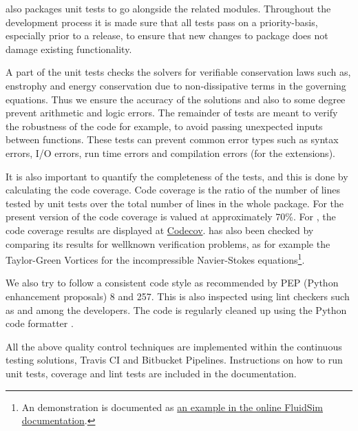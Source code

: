 
 also packages unit tests to go alongside the related
modules. Throughout the development process it is made sure that all tests pass
on a priority-basis, especially prior to a release, to ensure that new changes
to package does not damage existing functionality.

A part of the unit tests checks the solvers for verifiable conservation laws
such as, enstrophy and energy conservation due to non-dissipative terms in the
governing equations. Thus we ensure the accuracy of the solutions and also to
some degree prevent arithmetic and logic errors. The remainder of tests are
meant to verify the robustness of the code for example, to avoid passing
unexpected inputs between functions. These tests can prevent common error
types such as syntax errors, I/O errors, run time errors and compilation errors
(for the extensions).

It is also important to quantify the completeness of the tests, and this
is done by calculating the code coverage. Code coverage is the ratio of the
number of lines tested by unit tests over the total number of lines in the whole
package. For the present version of  the code coverage is
valued at approximately 70\%.
%
For , the code coverage results are displayed at
\href{https://codecov.io/bb/fluiddyn/fluidsim}{Codecov}.
%
 has also been checked by comparing its results for wellknown
verification problems, as for example the Taylor-Green Vortices for the
incompressible Navier-Stokes equations\footnote{An demonstration is documented
  as \href{https://fluidsim.readthedocs.io/en/latest/examples.html}{an example
  in the online FluidSim documentation}.
}.

We also try to follow a consistent code style as recommended by PEP (Python
enhancement proposals) 8 and 257. This is also inspected using lint
checkers such as  and  among the
developers. The code is regularly cleaned up using the Python code formatter
.

All the above quality control techniques are implemented within the continuous
testing solutions, Travis CI and Bitbucket Pipelines. Instructions on how to
run unit tests, coverage and lint tests are included in the documentation.

